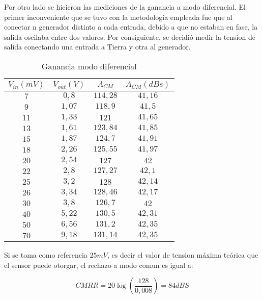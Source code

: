 Por otro lado se hicieron las mediciones de la ganancia a modo diferencial. El primer inconveniente que se tuvo con la metodolog\'ia empleada fue que al conectar n generador distinto a cada entrada, debido a que no estaban en fase, la salida oscilaba entre dos valores. Por consiguiente, se decidi\'o medir la tension de salida conectando una entrada a Tierra y otra al generador. 

\begin{table}[H]
\centering
\begin{tabular}{cccc}\hline
$V_{in}(mV)$ & $V_{out}(V)$ & $A_{CM}$ & $A_{CM} (dBs)$ \\
\hline
$7$   & $0,8$  & $114,28$ & $41,16$ \\
$9$  & $1,07$ & $118,9$ & $41,5$\\
$11$  & $1,33$ & $121$ & $41,65$\\
$13$  & $1,61$ & $123,84$ & $41,85$\\
$15$  & $1,87$ & $124,7$ & $41,91$\\
$18$  & $2,26$ & $125,55$ & $41,97$\\
$20$  & $2,54$ & $127$ & $42$\\
$22$  & $2,8$ & $127,27$ & $42,1$\\
$25$  & $3,2$ & $128$ & $42,14$\\
$26$  & $3,34$ & $128,46$ & $42,17$\\
$30$  & $3,8$ & $126,7$ & $42$\\
$40$  & $5,22$ & $130,5$ & $42,31$\\
$50$  & $6,56$ & $131,2$ & $42,35$\\
$70$  & $9,18$ & $131,14$ & $42,35$\\ \hline
\end{tabular}
\caption{Ganancia modo diferencial}
\label{table:ganancia_diferencial}
\end{table}

Si se toma como referencia $25mV$, es decir el valor de tension m\'axima te\'orica que el sensor puede otorgar, el rechazo a modo comun es igual a:

\begin{equation}
CMRR = 20\log(\frac{128}{0,008}) = \boxed{84 dBS}
\end{equation}

